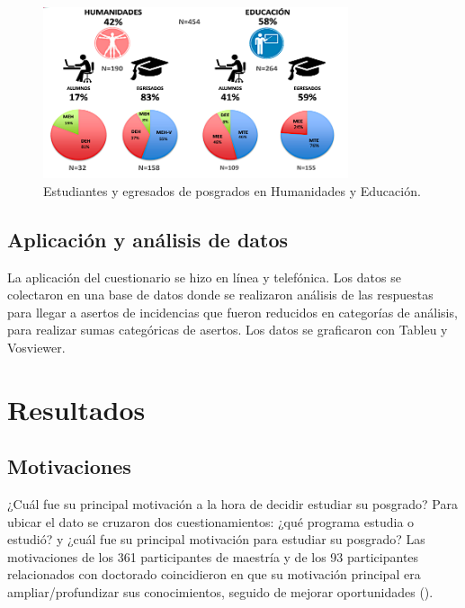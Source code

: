 \documentclass[spanish]{textolivre}
\begin{document}
\begin{figure}[htbp]
 \centering
 \includegraphics[width=0.8\textwidth]{Fig1.png}
 \caption{Estudiantes y egresados de posgrados en Humanidades y Educación.}
 \label{fig1}
\end{figure}

\subsection{Aplicación y análisis de datos}\label{sec-titulo}
La aplicación del cuestionario se hizo en línea y telefónica. Los datos se colectaron en una base de datos donde se realizaron análisis de las respuestas para llegar a asertos de incidencias \cite{stake_investigacion_2007} que fueron reducidos en categorías de análisis, para realizar sumas categóricas de asertos. Los datos se graficaron con Tableu y Vosviewer.

\section{Resultados}\label{sec-autores}

\subsection{Motivaciones}\label{sec-autores}
¿Cuál fue su principal motivación a la hora de decidir estudiar su posgrado?  Para ubicar el dato se cruzaron dos cuestionamientos: ¿qué programa estudia o estudió? y ¿cuál fue su principal motivación para estudiar su posgrado? Las motivaciones de los 361 participantes de maestría y de los 93 participantes relacionados con doctorado coincidieron en que su motivación principal era ampliar/profundizar sus conocimientos, seguido de mejorar oportunidades ().
 
\end{document}
